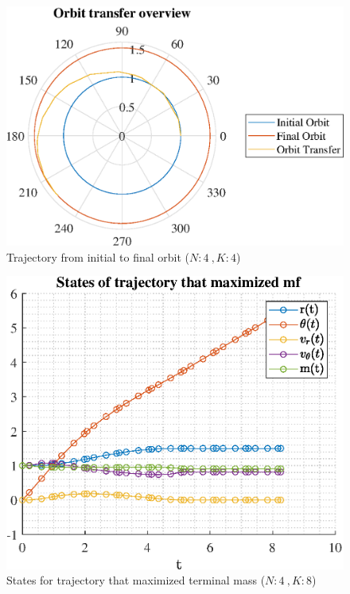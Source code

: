 \documentclass[]{article}
\begin{document}
	\begin{figure}
		\centering
		\includegraphics[scale=0.75]{orbit_N4_K4_C2_mf.eps}
		\caption{Trajectory from initial to final orbit (\(N:4\ , K:4\))}
		\label{fig:orbit_N4_K4_C2_mf}
	\end{figure}
	\begin{figure}
		\centering
		\includegraphics[scale=0.75]{states_N4_K8_C2_mf.eps}
		\caption{States for trajectory that maximized terminal mass (\(N:4\ , K:8\))}
		\label{fig:states_N4_K8_C2_mf}
	\end{figure}
\end{document}
